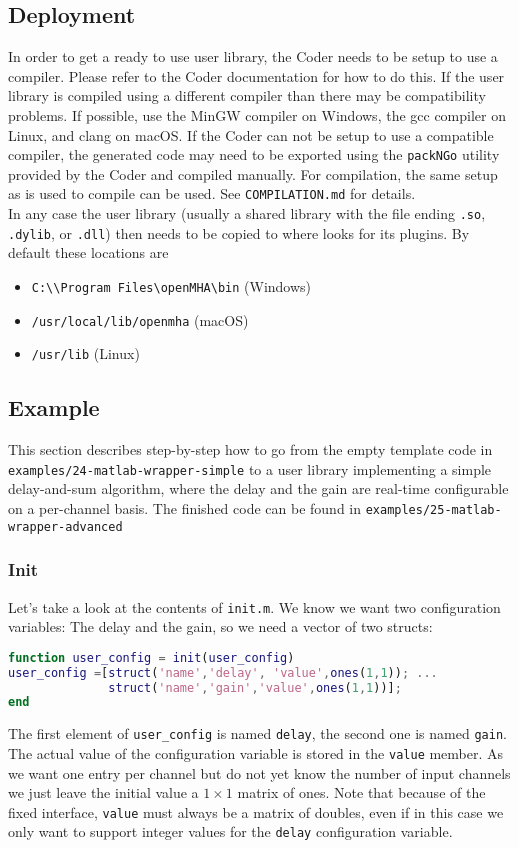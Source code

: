 \documentclass[11pt,a4paper,twoside]{article}
\newcommand{\+}{\discretionary{\mbox{\scriptsize$\hookleftarrow$}}{}{}}
\begin{document}
\subsection{Deployment}
\label{subsec:Deployment}
In order to get a ready to use user library, the \Matlab{} Coder needs to be
setup to use a compiler. Please refer to the \Matlab{} Coder documentation for
how to do this. If the user library is compiled using a different compiler than
\mha{} there may be compatibility problems. If possible, use the MinGW
compiler on Windows, the gcc compiler on Linux, and clang on macOS. If the \Matlab{} Coder
can not be setup to use a compatible compiler, the generated code may need to be
exported using the \texttt{packNGo} utility provided by the \Matlab{} Coder and
compiled manually. For compilation, the same setup as is used to compile \mha{}
can be used. See \texttt{COMPILATION.md} for details. \\
In any case the user library (usually a shared library with the file ending
\texttt{.so}, \texttt{.dylib}, or \texttt{.dll}) then needs to be copied to where
\mha{} looks for its plugins. By default these locations are
\begin{itemize}
\item \texttt{C:\textbackslash\textbackslash Program Files\textbackslash openMHA\textbackslash bin} (Windows)
\item \texttt{/usr/local/lib/openmha} (macOS)
\item \texttt{/usr/lib} (Linux)
\end{itemize}
\subsection{Example}
This section describes step-by-step how to go from the empty template code
in \\ \texttt{examples/24-matlab-wrapper-simple}
to a user library implementing a simple delay-and-sum algorithm, where the delay
and the gain are real-time configurable on a per-channel basis.
The finished code can be found in \texttt{examples/25-matlab-wrapper-advanced}
\subsubsection*{Init}
Let's take a look at the contents of \texttt{init.m}. We know we want two
configuration variables:
The delay and the gain, so we need a vector of two structs:
\begin{lstlisting}[language=Matlab]
function user_config = init(user_config)
user_config =[struct('name','delay', 'value',ones(1,1)); ...
              struct('name','gain','value',ones(1,1))];
end
\end{lstlisting}
The first element of \texttt{user\_config} is named \texttt{delay}, the second one is named
\texttt{gain}. The actual value of the configuration variable is stored in the \texttt{value}
member. As we want one entry per channel but do not yet know the number of input
channels we just leave the initial value a $1\times1$ matrix of ones. Note that because of
the fixed interface, \texttt{value} must always be a matrix of doubles, even if in this
case we only want to support integer values for the \texttt{delay} configuration variable.
\end{document}
